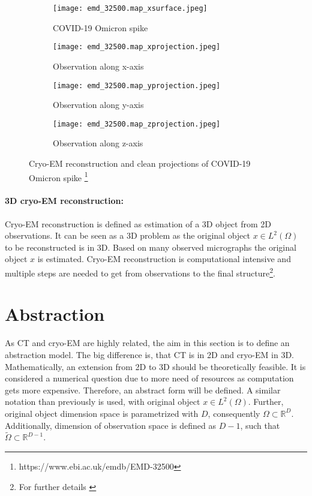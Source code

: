 \begin{figure}[H]
    \captionsetup[subfigure]{justification=centering}
    \centering
    \begin{subfigure}[t]{0.2\textwidth}
        \texttt{[image: emd\_32500.map\_xsurface.jpeg]}
        \caption{COVID-19 Omicron spike}
    \end{subfigure} \hfill
    \begin{subfigure}[t]{0.2\textwidth}
      \texttt{[image: emd\_32500.map\_xprojection.jpeg]}
      \caption{Observation along x-axis}
    \end{subfigure}\hfill
    \begin{subfigure}[t]{0.2\textwidth}
      \texttt{[image: emd\_32500.map\_yprojection.jpeg]}
      \caption{Observation along y-axis}
    \end{subfigure}\hfill
    \begin{subfigure}[t]{0.2\textwidth}
        \texttt{[image: emd\_32500.map\_zprojection.jpeg]}
        \caption{Observation along z-axis}
      \end{subfigure}
    \caption{Cryo-EM reconstruction and clean projections of COVID-19 Omicron spike \protect\footnote{https://www.ebi.ac.uk/emdb/EMD-32500}}
    \label{fig:cryo-em-omicron}
  \end{figure}


\paragraph{3D cryo-EM reconstruction:}
Cryo-EM reconstruction is defined as estimation of a 3D object from 2D observations.
It can be seen as a 3D problem as the original object $x \in L^2(\Omega)$ to be reconstructed is in 3D.
Based on many observed micrographs the original object $x$ is estimated.
Cryo-EM reconstruction is computational intensive and multiple steps are needed to get from 
observations to the final structure\footnote{For further details \cite{singleParticleCryoEm, cryoEmMath}}.



\section{Abstraction}
As CT and cryo-EM are highly related, the aim in this section is to define
an abstraction model. The big difference is, that CT is in 2D and cryo-EM in 3D.
Mathematically, an extension from 2D to 3D should be theoretically feasible. 
It is considered a numerical question due to more need of resources as computation gets more expensive.
Therefore, an abstract form will be defined.
A similar notation than previously is used, with original object $x \in L^2(\Omega)$.
Further, original object dimension space is parametrized with $D$, consequently $\Omega \subset \mathbb{R}^D$.
Additionally, dimension of observation space is defined as $D-1$, such that 
$\tilde{\Omega} \subset \mathbb{R}^{D-1}$.


